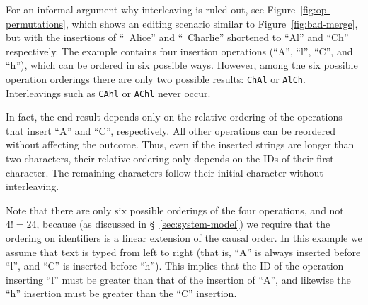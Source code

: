 For an informal argument why interleaving is ruled out, see Figure~\ref{fig:op-permutations}, which shows an editing scenario similar to Figure~\ref{fig:bad-merge}, but with the insertions of ``~Alice'' and ``~Charlie'' shortened to ``Al'' and ``Ch'' respectively.
The example contains four insertion operations (``A'', ``l'', ``C'', and ``h''), which can be ordered in six possible ways.
However, among the six possible operation orderings there are only two possible results: \texttt{ChAl} or \texttt{AlCh}.
Interleavings such as \texttt{CAhl} or \texttt{AChl} never occur.

In fact, the end result depends only on the relative ordering of the operations that insert ``A'' and ``C'', respectively.
All other operations can be reordered without affecting the outcome.
Thus, even if the inserted strings are longer than two characters, their relative ordering only depends on the IDs of their first character.
The remaining characters follow their initial character without interleaving.

Note that there are only six possible orderings of the four operations, and not $4! = 24$, because (as discussed in \S~\ref{sec:system-model}) we require that the ordering on identifiers is a linear extension of the causal order.
In this example we assume that text is typed from left to right (that is, ``A'' is always inserted before ``l'', and ``C'' is inserted before ``h'').
This implies that the ID of the operation inserting ``l'' must be greater than that of the insertion of ``A'', and likewise the ``h'' insertion must be greater than the ``C'' insertion.

